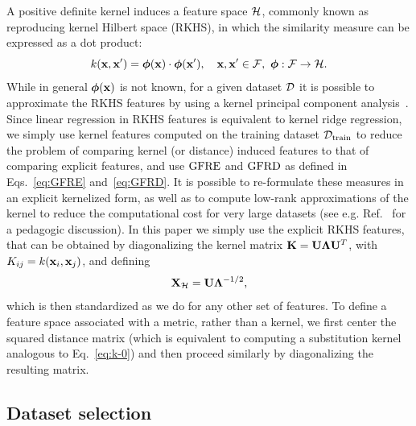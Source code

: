 A positive definite kernel induces a feature space $\mathcal{H}$, commonly known as reproducing kernel Hilbert space (RKHS), in which the similarity measure can be expressed as a dot product:
\begin{equation}
    k(\mathbf{x},\mathbf{x}^{\prime}) = \boldsymbol{\phi}(\mathbf{x})\cdot\boldsymbol{\phi}(\mathbf{x}^{\prime}),\quad \mathbf{x},\mathbf{x}^{\prime}\in\mathcal{F},\,\, \boldsymbol{\phi}:\mathcal{F}\rightarrow\mathcal{H}.
\end{equation}
While in general $\boldsymbol{\phi}(\mathbf{x})$ is not known, for a given dataset $\mathcal{D}$ it is possible to approximate the RKHS features by using a kernel principal component analysis~\cite{scholkopf1997kernel}. Since linear regression in RKHS features is equivalent to kernel ridge regression, we simply use kernel features computed on the training  dataset $\mathcal{D}_{\mathrm{train}}$ to reduce the problem of comparing kernel (or distance) induced features to that of comparing explicit features, and use $\operatorname{GFRE}$ and $\operatorname{GFRD}$ as defined in Eqs.~\eqref{eq:GFRE} and~\eqref{eq:GFRD}. 
It is possible to re-formulate these measures in an explicit kernelized form, as well as to compute low-rank approximations of the kernel to reduce the computational cost for very large datasets (see e.g. Ref.~ for a pedagogic discussion). In this paper we simply use the explicit RKHS features, that can be obtained by diagonalizing the kernel matrix $\mathbf{K} = \mathbf{U} \boldsymbol{\Lambda} \mathbf{U}^T$, with $K_{ij} = k(\mathbf{x}_i, \mathbf{x}_j)$, and defining
\begin{equation}
\mathbf{X}_{\mathcal{H}} = \mathbf{U} \boldsymbol{\Lambda}^{-1/2},
\end{equation}
which is then standardized as we do for any other set of features. 
To define a feature space associated with a metric, rather than a kernel, we first center the squared distance matrix (which is equivalent to computing a substitution kernel analogous to Eq.~\eqref{eq:k-0}) and then proceed similarly by diagonalizing the resulting matrix. 



\subsection{Dataset selection}

